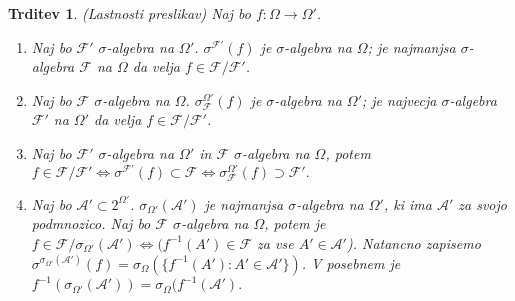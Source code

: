 \documentclass[a4paper,12pt]{article}
\theoremstyle{definition} %
\theoremstyle{plain} %
\newtheorem{trditev}[definicija]{Trditev}
\newcommand{\F}{\mathcal{F}}
\newcommand{\A}{\mathcal{A}}
\begin{document}
            \begin{trditev} (Lastnosti preslikav)
                Naj bo $f: \Omega \rightarrow \Omega'$.
                \begin{enumerate}
                    \item Naj bo $\F'$ $\sigma$-algebra na $\Omega'$. $\sigma^{\F'}(f)$ je $\sigma$-algebra na $\Omega$; je najmanjsa $\sigma$-algebra $\mathcal{F}$ na $\Omega$ da velja $f \in \mathcal{F}/\F'$.
                    \item Naj bo $\F$ $\sigma$-algebra na $\Omega$. $\sigma_{\F}^{\Omega'}(f)$ je $\sigma$-algebra na $\Omega'$; je najvecja $\sigma$-algebra $\mathcal{F}'$ na $\Omega'$ da velja $f \in \mathcal{F}/\F'$.
                    \item Naj bo $\F'$ $\sigma$-algebra na $\Omega'$ in $\F$ $\sigma$-algebra na $\Omega$, potem $f \in \F/\F' \iff \sigma^{\F'}(f) \subset \F \iff \sigma_{\F}^{\Omega'}(f) \supset \F'.$
                    \item Naj bo $\A' \subset 2^{\Omega'}$. $\sigma_{\Omega'}(\A')$ je najmanjsa $\sigma$-algebra na $\Omega'$, ki ima $\A'$ za svojo podmnozico. Naj bo $\F$ $\sigma$-algebra na $\Omega$, potem je $f \in \F/\sigma_{\Omega'}(\A') \iff (f^{-1}(A') \in \F$ za vse $A' \in \A'$). Natancno zapisemo $\sigma^{\sigma_{\Omega'}(\A')}(f) = \sigma_\Omega(\{f^{-1}(A'):A' \in \A'\})$. V posebnem je $f^{-1}(\sigma_{\Omega '}(\A ')) = \sigma_{\Omega}(f^{-1}(\A').$
                \end{enumerate}
            \end{trditev}
\end{document}
